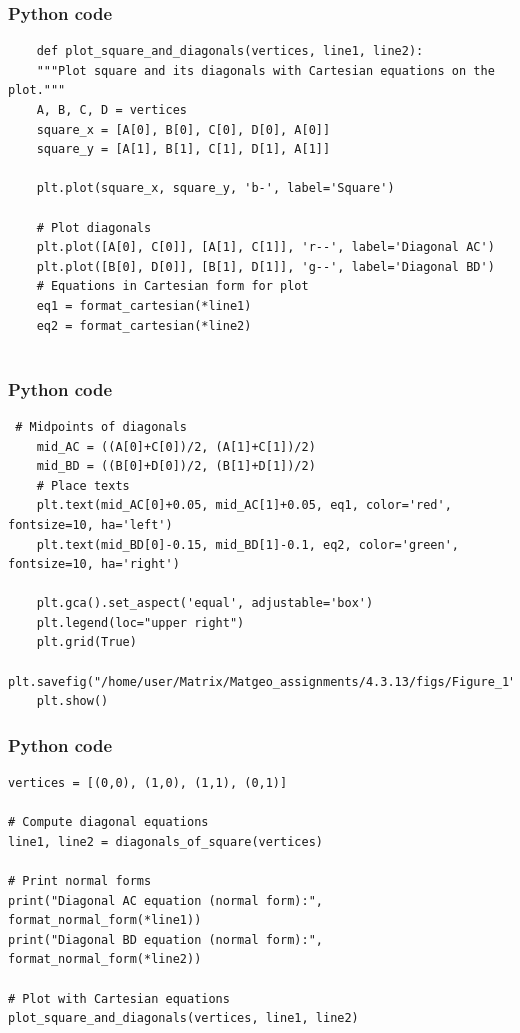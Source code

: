 \documentclass{beamer}
\begin{document}
\begin{frame}[fragile]
    \frametitle{Python code}

    \begin{lstlisting}
    def plot_square_and_diagonals(vertices, line1, line2):
    """Plot square and its diagonals with Cartesian equations on the plot."""
    A, B, C, D = vertices
    square_x = [A[0], B[0], C[0], D[0], A[0]]
    square_y = [A[1], B[1], C[1], D[1], A[1]]
    
    plt.plot(square_x, square_y, 'b-', label='Square')
    
    # Plot diagonals
    plt.plot([A[0], C[0]], [A[1], C[1]], 'r--', label='Diagonal AC')
    plt.plot([B[0], D[0]], [B[1], D[1]], 'g--', label='Diagonal BD')
    # Equations in Cartesian form for plot
    eq1 = format_cartesian(*line1)
    eq2 = format_cartesian(*line2)
   
    \end{lstlisting}
\end{frame}


\begin{frame}[fragile]
    \frametitle{Python code}

    \begin{lstlisting}
 # Midpoints of diagonals
    mid_AC = ((A[0]+C[0])/2, (A[1]+C[1])/2)
    mid_BD = ((B[0]+D[0])/2, (B[1]+D[1])/2)
    # Place texts
    plt.text(mid_AC[0]+0.05, mid_AC[1]+0.05, eq1, color='red', fontsize=10, ha='left')
    plt.text(mid_BD[0]-0.15, mid_BD[1]-0.1, eq2, color='green', fontsize=10, ha='right')
    
    plt.gca().set_aspect('equal', adjustable='box')
    plt.legend(loc="upper right")
    plt.grid(True)
    plt.savefig("/home/user/Matrix/Matgeo_assignments/4.3.13/figs/Figure_1")
    plt.show()
    \end{lstlisting}
\end{frame}

\begin{frame}[fragile]
    \frametitle{Python code}

    \begin{lstlisting}
vertices = [(0,0), (1,0), (1,1), (0,1)]

# Compute diagonal equations
line1, line2 = diagonals_of_square(vertices)

# Print normal forms
print("Diagonal AC equation (normal form):", format_normal_form(*line1))
print("Diagonal BD equation (normal form):", format_normal_form(*line2))

# Plot with Cartesian equations
plot_square_and_diagonals(vertices, line1, line2)


    \end{lstlisting}
\end{frame}
\end{document}
